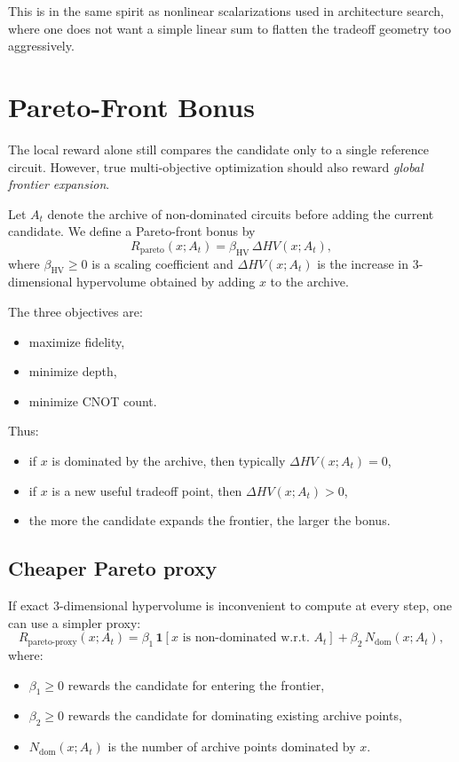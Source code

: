 \documentclass[11pt]{article}
\begin{document}
This is in the same spirit as nonlinear scalarizations used in architecture search, where one does not want a simple linear sum to flatten the tradeoff geometry too aggressively.

\section{Pareto-Front Bonus}

The local reward alone still compares the candidate only to a single reference circuit.
However, true multi-objective optimization should also reward \emph{global frontier expansion}.

Let $A_t$ denote the archive of non-dominated circuits before adding the current candidate.
We define a Pareto-front bonus by
\begin{equation}
    R_{\mathrm{pareto}}(x;A_t)=\beta_{\mathrm{HV}}\,\Delta HV(x;A_t),
\label{eq:RparetoHV}
\end{equation}
where $\beta_{\mathrm{HV}}\ge 0$ is a scaling coefficient and $\Delta HV(x;A_t)$ is the increase in 3-dimensional hypervolume obtained by adding $x$ to the archive.

The three objectives are:
\begin{itemize}
    \item maximize fidelity,
    \item minimize depth,
    \item minimize CNOT count.
\end{itemize}

Thus:
\begin{itemize}
    \item if $x$ is dominated by the archive, then typically $\Delta HV(x;A_t)=0$,
    \item if $x$ is a new useful tradeoff point, then $\Delta HV(x;A_t)>0$,
    \item the more the candidate expands the frontier, the larger the bonus.
\end{itemize}

\subsection{Cheaper Pareto proxy}

If exact 3-dimensional hypervolume is inconvenient to compute at every step, one can use a simpler proxy:
\begin{equation}
    R_{\mathrm{pareto\text{-}proxy}}(x;A_t)
    =
    \beta_1\,\mathbf{1}[x\text{ is non-dominated w.r.t. }A_t]
    +
    \beta_2\,N_{\mathrm{dom}}(x;A_t),
\label{eq:RparetoProxy}
\end{equation}
where:
\begin{itemize}
    \item $\beta_1\ge 0$ rewards the candidate for entering the frontier,
    \item $\beta_2\ge 0$ rewards the candidate for dominating existing archive points,
    \item $N_{\mathrm{dom}}(x;A_t)$ is the number of archive points dominated by $x$.
\end{itemize}
\end{document}
